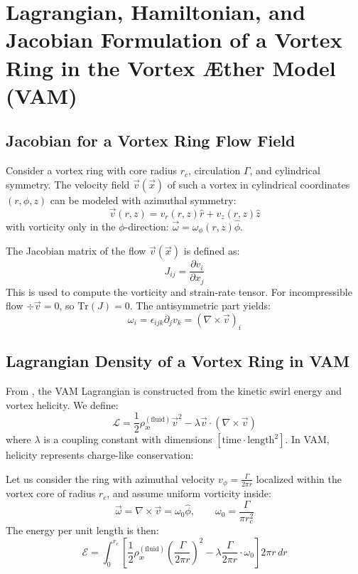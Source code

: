 \section{Lagrangian, Hamiltonian, and Jacobian Formulation of a Vortex Ring in the Vortex \AE ther Model (VAM)}

    \subsection{Jacobian for a Vortex Ring Flow Field}
    Consider a vortex ring with core radius $r_c$, circulation $\Gamma$, and cylindrical symmetry. The velocity field $\vec{v}(\vec{x})$ of such a vortex in cylindrical coordinates $(r, \phi, z)$ can be modeled with azimuthal symmetry:
    \begin{equation}
        \vec{v}(r, z) = v_r(r, z)\hat{r} + v_z(r, z)\hat{z}
    \end{equation}
    with vorticity only in the $\phi$-direction: $\vec{\omega} = \omega_\phi(r, z)\hat{\phi}$.

    The Jacobian matrix of the flow $\vec{v}(\vec{x})$ is defined as:
    \begin{equation}
        J_{ij} = \frac{\partial v_i}{\partial x_j}
    \end{equation}
    This is used to compute the vorticity and strain-rate tensor. For incompressible flow $\div \vec{v} = 0$, so $\mathrm{Tr}(J) = 0$. The antisymmetric part yields:
    \begin{equation}
        \omega_i = \epsilon_{ijk} \partial_j v_k = (\nabla \times \vec{v})_i
    \end{equation}

    \subsection{Lagrangian Density of a Vortex Ring in VAM}
    From \cite{VAM-1,VAM-2,VAM-0}, the VAM Lagrangian is constructed from the kinetic swirl energy and vortex helicity. We define:
    \begin{equation}
        \mathcal{L} = \frac{1}{2} \rho_\text{\ae}^{(\text{fluid})} \vec{v}^{2} - \lambda \vec{v} \cdot (\nabla \times \vec{v})
    \end{equation}
    where $\lambda$ is a coupling constant with dimensions $[\text{time} \cdot \text{length}^2]$. In VAM, helicity represents charge-like conservation:\cite{VAM-5,VAM-6}

    Let us consider the ring with azimuthal velocity $v_\phi = \frac{\Gamma}{2\pi r}$ localized within the vortex core of radius $r_c$, and assume uniform vorticity inside:
    \begin{equation}
        \vec{\omega} = \nabla \times \vec{v} = \omega_0\hat{\phi}, \qquad \omega_0 = \frac{\Gamma}{\pi r_c^2}
    \end{equation}
    The energy per unit length is then:
    \begin{equation}
        \mathcal{E} = \int_0^{r_c} \left[ \frac{1}{2} \rho_\text{\ae}^{(\text{fluid})} \left( \frac{\Gamma}{2\pi r} \right)^2 - \lambda \frac{\Gamma}{2\pi r} \cdot \omega_0 \right] 2\pi r \, dr
    \end{equation}


